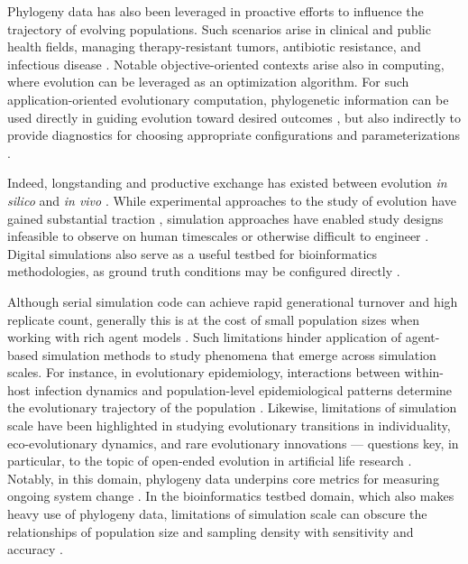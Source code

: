 Phylogeny data has also been leveraged in proactive efforts to influence the trajectory of evolving populations.
Such scenarios arise in clinical and public health fields, managing therapy-resistant tumors, antibiotic resistance, and infectious disease \citep{Scott2018,TODO}. %
Notable objective-oriented contexts arise also in computing, where evolution can be leveraged as an optimization algorithm.
For such application-oriented evolutionary computation, phylogenetic information can be used directly in guiding evolution toward desired outcomes \citep{lalejini2024phylogeny,lalejini2024runtime,murphy2008simple,burke2003increased}, but also indirectly to provide diagnostics for choosing appropriate configurations and parameterizations \citep{hernandez2022can,shahbandegan2022untangling}.

Indeed, longstanding and productive exchange has existed between evolution \textit{in silico} and \textit{in vivo} \citep{pennock2007models,dolson2021digital}.
While experimental approaches to the study of evolution have gained substantial traction \citep{TODO}, simulation approaches have enabled study designs infeasible to observe on human timescales or otherwise difficult to engineer \citep{wiser2013long,Stroud2025}.
Digital simulations also serve as a useful testbed for bioinformatics methodologies, as ground truth conditions may be configured directly \citep{daudey2024aevol,haller2023slim}.

Although serial simulation code can achieve rapid generational turnover and high replicate count, generally this is at the cost of small population sizes when working with rich agent models \citep{moreno2022engineering}.
Such limitations hinder application of agent-based simulation methods to study phenomena that emerge across simulation scales.
For instance, in evolutionary epidemiology, interactions between within-host infection dynamics and population-level epidemiological patterns determine the evolutionary trajectory of the population \citep{schreiber2021cross}.
Likewise, limitations of simulation scale have been highlighted in studying evolutionary transitions in individuality, eco-evolutionary dynamics, and rare evolutionary innovations \citep{taylor2016open,dolson2021digital,taylor2019evolutionary} --- questions key, in particular, to the topic of open-ended evolution in artificial life research \citep{TODOackley}.
Notably, in this domain, phylogeny data underpins core metrics for measuring ongoing system change \citep{dolsonMODESToolboxMeasurements2019}.
In the bioinformatics testbed domain, which also makes heavy use of phylogeny data, limitations of simulation scale can obscure the relationships of population size and sampling density with sensitivity and accuracy \citep{moreno2025extending,TODO}.

